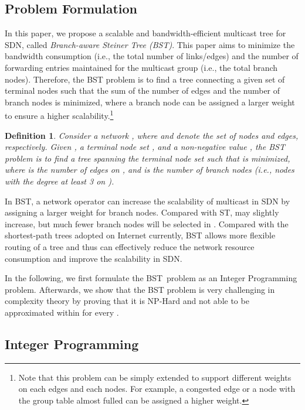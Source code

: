 \documentclass[conference]{IEEEtran}
\newtheorem{definition}{Definition}
\begin{document}
\subsection{Problem Formulation}

In this paper, we propose a scalable and bandwidth-efficient multicast tree
for SDN, called \textit{Branch-aware Steiner Tree (BST)}. This paper aims to
minimize the bandwidth consumption (i.e., the total number of links/edges)
and the number of forwarding entries maintained for the multicast group
(i.e., the total branch nodes). Therefore, the BST problem is to find a tree
connecting a given set of terminal nodes such that the sum of the number of
edges and the number of branch nodes is minimized, where a branch node can
be assigned a larger weight  to ensure a higher scalability.\footnote{Note that this problem can be simply extended to support different weights
on each edges and each nodes. For example, a congested edge or a node with
the group table almost fulled can be assigned a higher weight.}

\begin{definition}
Consider a network , where  and  denote the set of nodes and
edges, respectively. Given , a terminal node set , and
a non-negative value , the BST problem is to find a tree  spanning the
terminal node set  such that  is minimized, where  is
the number of edges on , and  is
the number of branch nodes (i.e., nodes with the degree at least 3 on ).
\end{definition}

In BST, a network operator can increase the scalability of multicast in SDN by
assigning a larger weight  for branch nodes. Compared with ST,  may
slightly increase, but much fewer branch nodes will be selected in .
Compared with the shortest-path trees adopted on Internet currently, BST
allows more flexible routing of a tree and thus can effectively reduce the
network resource consumption and improve the scalability in SDN.

In the following, we first formulate the BST\ problem as an Integer
Programming problem. Afterwards, we show that the BST problem is very
challenging in complexity theory by proving that it is NP-Hard and not able
to be approximated within  for every .

\subsection{Integer Programming}
\label{subsec:integer_programming}
\end{document}
